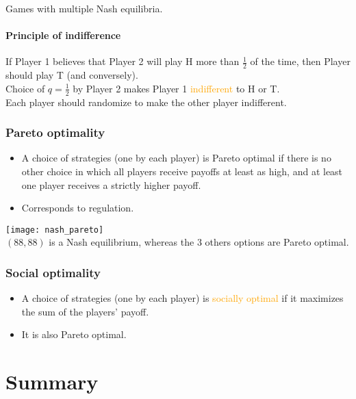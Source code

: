 Games with multiple Nash equilibria.

\paragraph{Principle of indifference}

If Player 1 believes that Player 2 will play H more than $\frac{1}{2}$ of the time, then Player should play T (and conversely).\\
Choice of $q = \frac{1}{2}$ by Player 2 makes Player 1 \textcolor{orange}{indifferent} to H or T.\\
Each player should randomize to make the other player indifferent.\\

\subsubsection{Pareto optimality}

\begin{itemize}
\item A choice of strategies (one by each player) is Pareto optimal if there is no other choice in which all players receive payoffs at least as high, and at least one player receives a strictly higher payoff.
\item Corresponds to regulation.
\end{itemize}

\begin{table}[H]
    \centering
    \texttt{[image: nash\_pareto]}\\
    $(88, 88)$ is a Nash equilibrium, whereas the 3 others options are Pareto optimal.
\end{table}

\subsubsection{Social optimality}

\begin{itemize}
\item A choice of strategies (one by each player) is \textcolor{orange}{socially optimal} if it maximizes the sum of the players' payoff.
\item It is also Pareto optimal.
\end{itemize}

\section{Summary}

